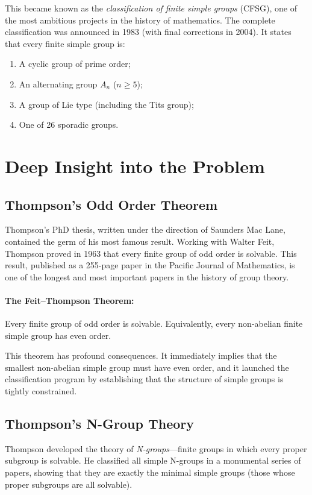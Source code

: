 This became known as the \emph{classification of finite simple groups} (CFSG), one of the most ambitious projects in the history of mathematics. The complete classification was announced in 1983 (with final corrections in 2004). It states that every finite simple group is:

\begin{enumerate}
\item A cyclic group of prime order;
\item An alternating group $A_n$ ($n \geq 5$);
\item A group of Lie type (including the Tits group);
\item One of 26 sporadic groups.
\end{enumerate}

\section{Deep Insight into the Problem}

\subsection{Thompson's Odd Order Theorem}

Thompson's PhD thesis, written under the direction of Saunders Mac Lane, contained the germ of his most famous result. Working with Walter Feit, Thompson proved in 1963 that every finite group of odd order is solvable. This result, published as a 255-page paper in the Pacific Journal of Mathematics, is one of the longest and most important papers in the history of group theory.

\paragraph{The Feit--Thompson Theorem:} Every finite group of odd order is solvable. Equivalently, every non-abelian finite simple group has even order.

This theorem has profound consequences. It immediately implies that the smallest non-abelian simple group must have even order, and it launched the classification program by establishing that the structure of simple groups is tightly constrained.

\subsection{Thompson's N-Group Theory}

Thompson developed the theory of \emph{N-groups}---finite groups in which every proper subgroup is solvable. He classified all simple N-groups in a monumental series of papers, showing that they are exactly the minimal simple groups (those whose proper subgroups are all solvable).

